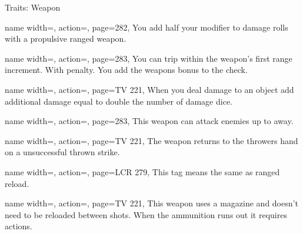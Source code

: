 \begin{PageBackLandscape}
\begin{TablesHalf}{\backTableHeight}
\begin{Table}{Traits: Weapon}
\begin{entry}{}{%
                name width=\conditionLength,%
                action=\Propulsive,
                page=282,
            }
                You add half your \Strength modifier to damage rolls with a propulsive ranged weapon. \hfill
            \end{entry}
            \begin{entry}{}{%
                name width=\conditionLength,%
                action=\RangedTrip,
                page=283,
            }
                You can trip within the weapon's first range increment.
                With  \Cirm penalty. \hfill
                You add the weapons \Item bonus to the check.
            \end{entry}
            \begin{entry}{}{%
                name width=\conditionLength,%
                action=\Razing,
                page=TV 221,
            }
                When you deal damage to an object add additional damage equal to double the number of damage dice.
            \end{entry}
            \begin{entry}{}{%
                name width=\conditionLength,%
                action=\Reach,
                page=283,
            }
                This weapon can attack enemies up to  \Feet away. \hfill
            \end{entry}
            \begin{entry}{}{%
                name width=\conditionLength,%
                action=\Recovery,
                page=TV 221,
            }
                The weapon returns to the throwers hand on a unsuccessful thrown strike.
            \end{entry}
            \begin{entry}{}{%
                name width=\conditionLength,%
                action=\Reload,
                page=LCR 279,
            }
                This tag means the same as ranged reload.
            \end{entry}
            \begin{entry}{}{%
                name width=\conditionLength,%
                action=\Repeating,
                page=TV 221,
            }
                This weapon uses a magazine and  doesn't need to be reloaded between shots.\hfill
                When the ammunition runs out it requires   actions.
            \end{entry}

\end{Table}
\end{TablesHalf}
\end{PageBackLandscape}
